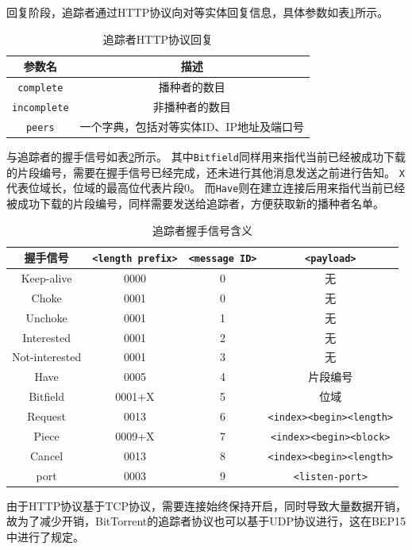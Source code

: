 \documentclass[thesis]{thesis}
\begin{document}
	回复阶段，追踪者通过HTTP协议向对等实体回复信息，具体参数如表\ref{tab:respond}所示。
	\begin{table}[htbp]
		\caption{追踪者HTTP协议回复}
		\label{tab:respond}
		\centering
		\begin{tabular}{|c|c|}\hline
			\textbf{参数名} & \textbf{描述}\\\hline
			\verb'complete' & 播种者的数目\\\hline
			\verb'incomplete' & 非播种者的数目\\\hline
			\verb'peers' & 一个字典，包括对等实体ID、IP地址及端口号\\\hline
		\end{tabular}
	\end{table}
	
	与追踪者的握手信号如表\ref{tab:tracker_handshake}所示。
	其中\verb'Bitfield'同样用来指代当前已经被成功下载的片段编号，需要在握手信号已经完成，还未进行其他消息发送之前进行告知。
	\verb'X'代表位域长，位域的最高位代表片段0。
	而\verb'Have'则在建立连接后用来指代当前已经被成功下载的片段编号，同样需要发送给追踪者，方便获取新的播种者名单。
	\begin{table}[htbp]
		\caption{追踪者握手信号含义}
		\label{tab:tracker_handshake}
		\centering
		\begin{tabular}{|c|c|c|c|}\hline
			\textbf{握手信号} & \verb'<length prefix>' & \verb'<message ID>' & \verb'<payload>'\\\hline
			Keep-alive & 0000 & 0 & 无\\\hline
			Choke & 0001 & 0 & 无\\\hline
			Unchoke & 0001 & 1 & 无\\\hline
			Interested & 0001 & 2 & 无\\\hline
			Not-interested & 0001 & 3 & 无\\\hline
			Have & 0005 & 4 & 片段编号\\\hline
			Bitfield & 0001+X & 5 & 位域\\\hline
			Request & 0013 & 6 & \verb'<index><begin><length>'\\\hline
			Piece & 0009+X & 7 & \verb'<index><begin><block>'\\\hline
			Cancel & 0013 & 8 & \verb'<index><begin><length>'\\\hline
			port & 0003 & 9 & \verb'<listen-port>'\\\hline
		\end{tabular}
	\end{table}
	
	由于HTTP协议基于TCP协议，需要连接始终保持开启，同时导致大量数据开销，故为了减少开销，BitTorrent的追踪者协议也可以基于UDP协议进行，这在BEP15\cite{bt_udp}中进行了规定。
	
\end{document}
